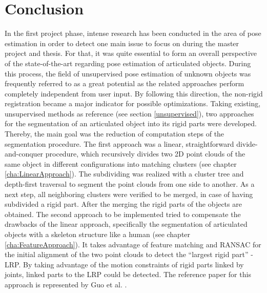 \chapter{Conclusion}
\label{cha:Conclusion}

In the first project phase, intense research has been conducted in the area of pose estimation in order to detect one main issue to focus on during the master project and thesis. For that, it was quite essential to form an overall perspective of the state-of-the-art regarding pose estimation of articulated objects. During this process, the field of unsupervised pose estimation of unknown objects was frequently referred to as a great potential as the related approaches perform completely independent from user input. By following this direction, the non-rigid registration became a major indicator for possible optimizations. Taking existing, unsupervised methods as reference (see section \ref{unsupervised}), two approaches for the segmentation of an articulated object into its rigid parts were developed. Thereby, the main goal was the reduction of computation steps of the segmentation procedure. The first approach was a linear, straightforward  divide-and-conquer procedure, which recursively divides two 2D point clouds of the same object in different configurations into matching clusters (see chapter \ref{cha:LinearApproach}). The subdividing was realized with a cluster tree and depth-first traversal to segment the point clouds from one side to another. As a next step, all neighboring clusters were verified to be merged, in case of having subdivided a rigid part. After the merging the rigid parts of the objects are obtained. The second approach to be implemented tried to compensate the drawbacks of the linear approach, specifically the segmentation of articulated objects with a skeleton structure like a human (see chapter \ref{cha:FeatureApproach}). It takes advantage of feature matching \cite{FPFH} and RANSAC for the initial alignment of the two point clouds to detect the ``largest rigid part'' - LRP. By taking advantage of the motion constraints of rigid parts linked by joints, linked parts to the LRP could be detected. The reference paper for this approach is represented by Guo et al. \cite{guo2016correspondence}.

